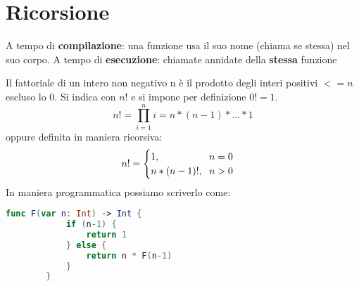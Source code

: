 \newpage
\section{Ricorsione}
\begin{definition}[Ricorsione]
	A tempo di \textbf{compilazione}: una funzione usa il suo nome (chiama se stessa) nel suo corpo.
	A tempo di \textbf{esecuzione}: chiamate annidate della \textbf{stessa} funzione
\end{definition}
\begin{example}[Fattoriale]
	Il fattoriale di un intero non negativo n è il prodotto
	degli interi positivi $<= n$ escluso lo $0$. Si indica con
	$n!$ e si impone per definizione $0! = 1$.
	\begin{equation}
		n! = \prod_{i=1}^{n} i=n*(n-1)*\ldots*1
	\end{equation}
	oppure definita in maniera ricorsiva:
	\begin{equation}
		n! = \begin{cases}
			1, \hspace{50px} n=0 \\
			n*(n-1)!, \hspace{6px} n>0
		\end{cases}
	\end{equation}
	In maniera programmatica possiamo scriverlo come:
	\begin{lstlisting}[language=Swift, caption=Fattoriale con ricorsione, mathescape=true]
		func F(var n: Int) -> Int {
			if (n-1) {
				return 1
			} else {
				return n * F(n-1)
			}
		}
	\end{lstlisting}
\end{example}